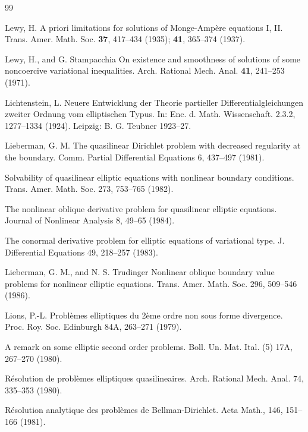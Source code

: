 
\begin{thebibliography}{99}

Lewy, H.
\newblock A priori limitations for solutions of Monge-Ampère equations I, II.
\newblock Trans. Amer. Math.
Soc. {\bf 37}, 417--434 (1935); {\bf 41}, 365--374 (1937).

Lewy, H., and G. Stampacchia
\newblock On existence and smoothness of solutions of some noncoercive variational inequalities.
\newblock Arch. Rational Mech. Anal. {\bf 41}, 241--253 (1971).

Lichtenstein, L.
\newblock Neuere Entwicklung der Theorie partieller Differentialgleichungen zweiter Ordnung
\newblock vom elliptischen Typus. In: Enc. d. Math. Wissenschaft. 2.3.2, 1277--1334 (1924). Leipzig:
\newblock B. G. Teubner 1923--27.

Lieberman, G. M.
\newblock The quasilinear Dirichlet problem with decreased regularity at the boundary. Comm.
\newblock Partial Differential Equations 6, 437--497 (1981).

\newblock Solvability of quasilinear elliptic equations with nonlinear boundary conditions. Trans.
\newblock Amer. Math. Soc. 273, 753--765 (1982).

\newblock The nonlinear oblique derivative problem for quasilinear elliptic equations. Journal of
\newblock Nonlinear Analysis 8, 49--65 (1984).

\newblock The conormal derivative problem for elliptic equations of variational type. J. Differential
\newblock Equations 49, 218--257 (1983).

Lieberman, G. M., and N. S. Trudinger
\newblock Nonlinear oblique boundary value problems for nonlinear elliptic equations. Trans. Amer.
\newblock Math. Soc. 296, 509--546 (1986).

Lions, P.-L.
\newblock Problèmes elliptiques du 2ème ordre non sous forme divergence. Proc. Roy. Soc. Edinburgh
\newblock 84A, 263--271 (1979).

\newblock A remark on some elliptic second order problems. Boll. Un. Mat. Ital. (5) 17A, 267--270
\newblock (1980).

\newblock Résolution de problèmes elliptiques quasilineaires. Arch. Rational Mech. Anal. 74, 335--353
\newblock (1980).

\newblock Résolution analytique des problèmes de Bellman-Dirichlet. Acta Math., 146, 151--166
\newblock (1981).


\end{thebibliography}
